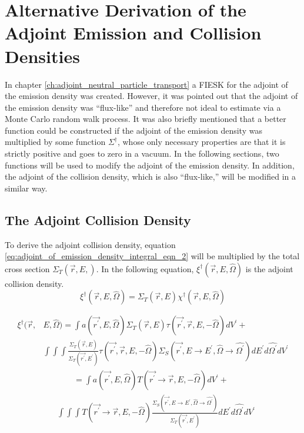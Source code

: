 \chapter{Alternative Derivation of the Adjoint Emission and Collision Densities}
\label{ch:appendix_a}

In chapter \ref{ch:adjoint_neutral_particle_transport} a FIESK for the adjoint
of the emission density was created. However, it was pointed out that the 
adjoint of the emission density was ``flux-like'' and therefore not ideal to
estimate via a Monte Carlo random walk process. It was also briefly mentioned
that a better function could be constructed if the adjoint of the emission
density was multiplied by some function $\Sigma^{\dagger}$, whose only necessary
properties are that it is strictly positive and goes to zero in a vacuum. In 
the following sections, two functions will be used to modify the adjoint of
the emission density. In addition, the adjoint of the collision density, which
is also ``flux-like,'' will be modified in a similar way.

\section{The Adjoint Collision Density}
To derive the adjoint collision density, equation 
\ref{eq:adjoint_of_emission_density_integral_eqn_2} will be multiplied by
the total cross section $\Sigma_T(\vec{r},E,)$. In the following equation,
$\xi^{\dagger}(\vec{r},E,\hat{\Omega})$ is the adjoint collision density.
\begin{equation}
  \xi^{\dagger}(\vec{r},E,\hat{\Omega}) = \Sigma_T(\vec{r},E)
  \chi^{\dagger}(\vec{r},E,\hat{\Omega})
\end{equation}

\begin{equation*}
  \begin{split}
  \xi^{\dagger}(\vec{r},&E,\hat{\Omega}) = \int a(\vec{r^{'}},E,\hat{\Omega}) 
    \Sigma_T(\vec{r},E) \tau(\vec{r^{'}},\vec{r},E,-\hat{\Omega}) dV^{'} + \\
    & \int\int\int  \frac{\Sigma_T(\vec{r},E)}{\Sigma_T(\vec{r^{'}},E^{'})}
      \tau(\vec{r^{'}},\vec{r},E,-\hat{\Omega}) 
    \Sigma_S(\vec{r^{'}},E \to E^{'},\hat{\Omega} \to \hat{\Omega^{'}})
    dE^{'}d\hat{\Omega^{'}}dV^{'}
  \end{split}
\end{equation*}
\begin{equation*}
  \begin{split}
  &\text{} \qquad = \int a(\vec{r^{'}},E,\hat{\Omega}) 
    T(\vec{r^{'}} \to \vec{r},E,-\hat{\Omega}) dV^{'} + \\
    & \int\int\int
      T(\vec{r^{'}} \to \vec{r},E,-\hat{\Omega})
      \frac{\Sigma_S(\vec{r^{'}},E \to E^{'},\hat{\Omega} \to \hat{\Omega^{'}})}
           {\Sigma_T(\vec{r^{'}},E^{'})}
    dE^{'}d\hat{\Omega^{'}}dV^{'}
  \end{split}
\end{equation*}

